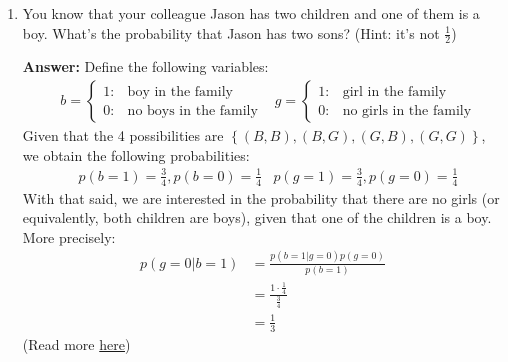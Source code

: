 \documentclass{article}
\newenvironment{QandA}{\begin{enumerate}[label=\arabic*.]}{\end{enumerate}}
\newenvironment{answer}{\par\normalfont \textbf{Answer:}}{}
\newcommand{\g}{\vert}
\begin{document}
\begin{QandA}
    \item You know that your colleague Jason has two children and one of them is a boy. What’s the probability that Jason has two sons? (Hint: it’s not $\frac{1}{2}$)
    \begin{answer}
        Define the following variables:
        \begin{align*}
            &b = \begin{cases}
                1: &\text{boy in the family} \\
                0: &\text{no boys in the family}
            \end{cases}
            &g = \begin{cases}
                1: &\text{girl in the family} \\
                0: &\text{no girls in the family}
            \end{cases}
        \end{align*}
        Given that the 4 possibilities are $\left\{ (B, B), (B, G), (G, B), (G, G) \right\}$, we obtain the following probabilities:
        \begin{align*}
            &p(b=1) = \frac{3}{4}, p(b=0) = \frac{1}{4} &p(g=1) = \frac{3}{4}, p(g=0) = \frac{1}{4}
        \end{align*}
        With that said, we are interested in the probability that there are no girls (or equivalently, both children are boys), given that one of the children is a boy. More precisely:
        \begin{align*}
            p(g=0 \g b = 1) &= \frac{p(b=1 \g g = 0) p(g=0)}{p(b=1)} \\
            &= \frac{1 \cdot \frac{1}{4}}{\frac{3}{4}} \\
            &= \frac{1}{3}
        \end{align*}
        (Read more \href{https://en.wikipedia.org/wiki/Boy_or_Girl_paradox}{here})
    \end{answer}
    

\end{QandA}
\end{document}
